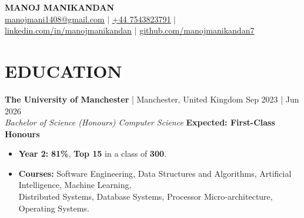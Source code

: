 \documentclass[a4paper]{extarticle}
\begin{document}
\pagestyle{empty}

\begin{center}
  \textbf{\Large MANOJ MANIKANDAN}\\[2pt] %
  \href{mailto:manojmani1408@gmail.com}{\underline{manojmani1408@gmail.com}}
  $|$ \href{tel:447543823791}{\underline{+44 7543823791}}  $|$
  \href{https://www.linkedin.com/in/manojmanikandan}{\underline{linkedin.com/in/manojmanikandan}}
  $|$
  \href{https://github.com/manojmanikandan7}{\underline{github.com/manojmanikandan7}}
\end{center}
\section*{EDUCATION}
\textbf{The University of Manchester} | Manchester, United Kingdom
\hfill Sep 2023 | Jun 2026\\ %
\textit{Bachelor of Science (Honours) Computer Science} \hfill
\textbf{Expected: First-Class Honours} %
\begin{itemize}
  \item \textbf{Year 2: } \textbf{81\%}, \textbf{Top 15} in a class
    of \textbf{300}.
  \item \textbf{Courses:} Software Engineering, Data Structures and
    Algorithms, Artificial Intelligence, Machine Learning, \\
    Distributed Systems, Database Systems, Processor
    Micro-architecture, Operating Systems. %
\end{itemize}


\end{document}
